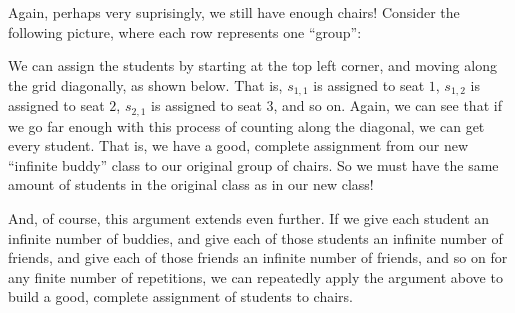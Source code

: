 \documentclass[10pt]{article}
\begin{document}
Again, perhaps very suprisingly, we still have enough chairs!
Consider the following picture, where each row represents one ``group'':


We can assign the students by starting at the top left corner, and moving along the grid diagonally, as shown below.
That is, $s_{1,1}$ is assigned to seat $1$, $s_{1,2}$ is assigned to seat $2$, $s_{2,1}$ is assigned to seat $3$, and so on.
Again, we can see that if we go far enough with this process of counting along the diagonal, we can get every student.
That is, we have a good, complete assignment from our new ``infinite buddy'' class to our original group of chairs.
So we must have the same amount of students in the original class as in our new class!

And, of course, this argument extends even further.
If we give each student an infinite number of buddies, and give each of those students an infinite number of friends, and give each of those friends an infinite number of friends, and so on for any finite number of repetitions, we can repeatedly apply the argument above to build a good, complete assignment of students to chairs.
\end{document}
